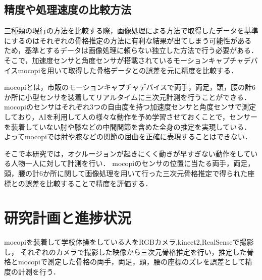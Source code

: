 \documentclass[titlepage]{jarticle}
\begin{document}
%
%
\subsection{精度や処理速度の比較方法}
%
三種類の現行の方法を比較する際，画像処理による方法で取得したデータを基準にするのはそれぞれの骨格推定の方法に有利な結果が出てしまう可能性があるため，基準とするデータは画像処理に頼らない独立した方法で行う必要がある．
そこで，加速度センサと角度センサが搭載されているモーションキャプチャデバイスmocopi\cite{mocopi}を用いて取得した骨格データとの誤差を元に精度を比較する．

mocopiとは，市販のモーションキャプチャデバイスで両手，両足，頭，腰の計6か所に小型センサを装着してリアルタイムに三次元計測を行うことができる．
mocopiのセンサはそれぞれ3つの自由度を持つ加速度センサと角度センサで測定しており，AIを利用して人の様々な動作を予め学習させておくことで，センサーを装着していない肘や膝などの中間関節を含めた全身の推定を実現している．
よってmocopiでは肘や膝などの関節の屈曲を正確に表現することはできない．

そこで本研究では，オクルージョンが起きにくく動きが早すぎない動作をしている人物一人に対して計測を行い．
mocopiのセンサの位置に当たる両手，両足，頭，腰の計6か所に関して画像処理を用いて行った三次元骨格推定で得られた座標との誤差を比較することで精度を評価する．
%
%
%

%
%
%
%
%

%
%
%
%
\section{研究計画と進捗状況}
%

%
%
%
mocopiを装着して学校体操をしている人をRGBカメラ,kinect2,RealSenseで撮影し，
それぞれのカメラで撮影した映像から三次元骨格推定を行い，推定した骨格とmocopiで測定した骨格の両手，両足，頭，腰の座標のズレを誤差として精度の計測を行う．
\end{document}
